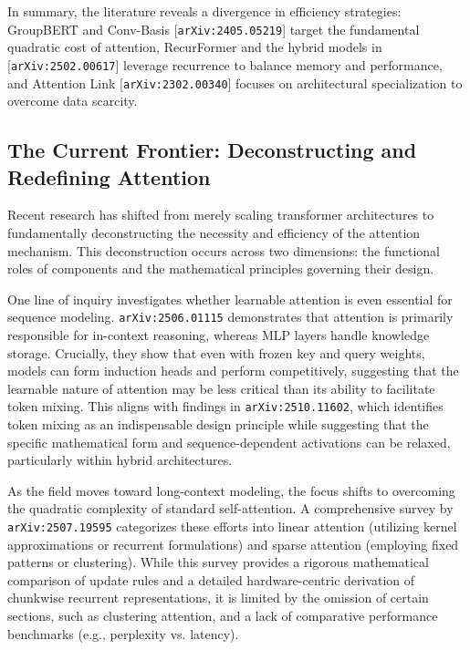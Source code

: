 \documentclass[11pt]{article}
\begin{document}
In summary, the literature reveals a divergence in efficiency strategies: GroupBERT and Conv-Basis [\texttt{arXiv:2405.05219}] target the fundamental quadratic cost of attention, RecurFormer and the hybrid models in [\texttt{arXiv:2502.00617}] leverage recurrence to balance memory and performance, and Attention Link [\texttt{arXiv:2302.00340}] focuses on architectural specialization to overcome data scarcity.

\subsection{The Current Frontier: Deconstructing and Redefining Attention}

Recent research has shifted from merely scaling transformer architectures to fundamentally deconstructing the necessity and efficiency of the attention mechanism. This deconstruction occurs across two dimensions: the functional roles of components and the mathematical principles governing their design.

One line of inquiry investigates whether learnable attention is even essential for sequence modeling. \texttt{arXiv:2506.01115} demonstrates that attention is primarily responsible for in-context reasoning, whereas MLP layers handle knowledge storage. Crucially, they show that even with frozen key and query weights, models can form induction heads and perform competitively, suggesting that the learnable nature of attention may be less critical than its ability to facilitate token mixing. This aligns with findings in \texttt{arXiv:2510.11602}, which identifies token mixing as an indispensable design principle while suggesting that the specific mathematical form and sequence-dependent activations can be relaxed, particularly within hybrid architectures.

As the field moves toward long-context modeling, the focus shifts to overcoming the quadratic complexity of standard self-attention. A comprehensive survey by \texttt{arXiv:2507.19595} categorizes these efforts into linear attention (utilizing kernel approximations or recurrent formulations) and sparse attention (employing fixed patterns or clustering). While this survey provides a rigorous mathematical comparison of update rules and a detailed hardware-centric derivation of chunkwise recurrent representations, it is limited by the omission of certain sections, such as clustering attention, and a lack of comparative performance benchmarks (e.g., perplexity vs. latency).
\end{document}
